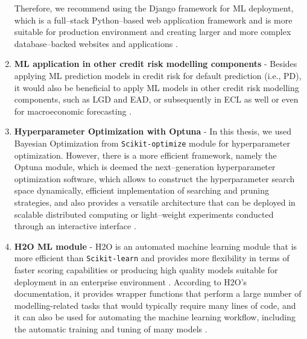 \begin{enumerate}
    Therefore, we recommend using the Django framework for ML deployment, which is a full--stack Python--based web application framework and is more suitable for production environment
    and creating larger and more complex database--backed websites and applications \citep{khatri2023}.
    \item \textbf{ML application in other credit risk modelling components} - Besides applying ML prediction models in credit risk for default prediction (i.e., PD),
    it would also be beneficial to apply ML models in other credit risk modelling components, such as LGD and EAD, or subsequently in ECL as well \citep{munkhdalai2019empirical, grzybowska2020application} or even for macroeconomic forecasting \citep{hall2018machine}.\item \textbf{Hyperparameter Optimization with Optuna} - In this thesis, we used Bayesian Optimization from \lstinline{Scikit-optimize} module for hyperparameter optimization.
    However, there is a more efficient framework, namely the Optuna module, which is deemed the next--generation hyperparameter optimization software,
    which allows to construct the hyperparameter search space dynamically, efficient implementation of searching and pruning strategies, and also provides a versatile architecture that can be deployed in scalable distributed computing or light--weight experiments conducted through an interactive interface \citep{akiba2019optuna}.
    \item \textbf{H2O ML module} - H2O is an automated machine learning module that is more efficient than \lstinline{Scikit-learn} and provides more flexibility in terms of faster scoring capabilities or producing high quality models suitable for deployment in an enterprise environment \citep{ledell2020h2o}.
    According to H2O's documentation, it provides wrapper functions that perform a large number of modelling-related tasks that would typically require many lines of code, and it can also be used for automating the machine learning workflow, including the automatic training and tuning of many models \citep{H2Oai2023}.
\end{enumerate}